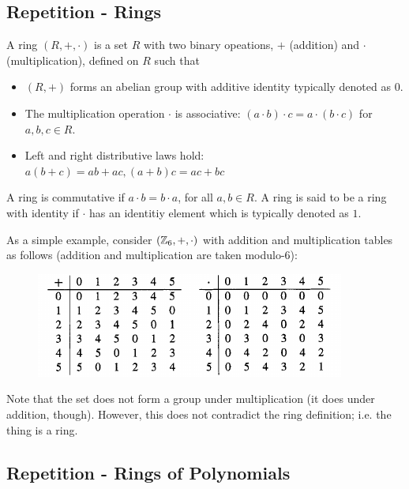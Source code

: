 
\subsection{Repetition - Rings}

\begin{definition}
  A ring $(R,+,\cdot)$ is a set $R$ with two binary opeations, $+$ (addition) and $\cdot$ (multiplication), defined on $R$ such that

  \begin{itemize}
    \item $(R,+)$ forms an abelian group with additive identity typically denoted as $0$.
    \item The multiplication operation $\cdot$ is associative: $(a \cdot b) \cdot c = a \cdot (b \cdot c)$ for $a,b,c \in R$.
    \item Left and right distributive laws hold: $a(b+c) = ab + ac, (a+b)c = ac + bc$
  \end{itemize}
%
  A ring is commutative if $a \cdot b = b \cdot a$, for all $a,b \in R$. A ring is said to be a ring with identity if $\cdot$ has an identitiy element which is typically denoted as $1$.

\end{definition}

As a simple example, consider $(\mathbb{Z}_6, +, \cdot)$ with addition and multiplication tables as follows (addition and multiplication are taken modulo-6):

\begin{figure}[H]
  \includegraphics[scale=0.75]{images/cyclic_codes_01.png}
\end{figure}

Note that the set does not form a group under multiplication (it does under addition, though). However, this does not contradict the ring definition; i.e. the thing is a ring.


\subsection{Repetition - Rings of Polynomials}

